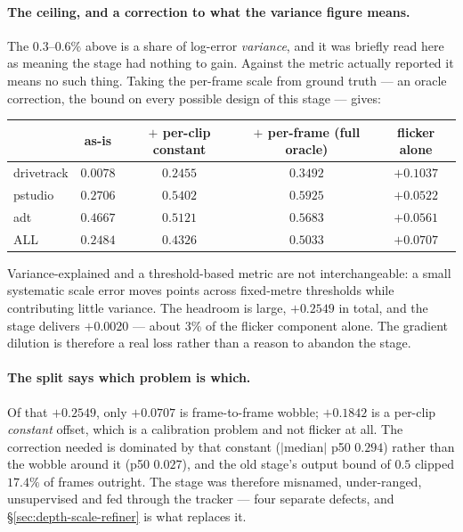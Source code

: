 \documentclass[11pt,a4paper]{article}
\begin{document}


\paragraph{The ceiling, and a correction to what the variance figure means.} The
$0.3$--$0.6\%$ above is a share of log-error \emph{variance}, and it was briefly read here as
meaning the stage had nothing to gain. Against the metric actually reported it means no such thing.
Taking the per-frame scale from ground truth --- an oracle correction, the bound on every possible
design of this stage --- gives:

\begin{center}\small
\begin{tabular}{lcccc}
\toprule
& as-is & $+$ per-clip constant & $+$ per-frame (full oracle) & flicker alone \\
\midrule
drivetrack & $0.0078$ & $0.2455$ & $0.3492$ & $+0.1037$ \\
pstudio    & $0.2706$ & $0.5402$ & $0.5925$ & $+0.0522$ \\
adt        & $0.4667$ & $0.5121$ & $0.5683$ & $+0.0561$ \\
\midrule
ALL        & $0.2484$ & $0.4326$ & $\mathbf{0.5033}$ & $\mathbf{+0.0707}$ \\
\bottomrule
\end{tabular}
\end{center}

Variance-explained and a threshold-based metric are not interchangeable: a small systematic scale
error moves points across fixed-metre thresholds while contributing little variance. The headroom is
large, $+0.2549$ in total, and the stage delivers $+0.0020$ --- about $3\%$ of the flicker component
alone. The gradient dilution is therefore a real loss rather than a reason to abandon the stage.

\paragraph{The split says which problem is which.} Of that $+0.2549$, only $+0.0707$ is
frame-to-frame wobble; $+0.1842$ is a per-clip \emph{constant} offset, which is a calibration
problem and not flicker at all. The correction needed is dominated by that constant ($|$median$|$
p50 $0.294$) rather than the wobble around it (p50 $0.027$), and the old stage's output bound of
$0.5$ clipped $17.4\%$ of frames outright. The stage was therefore misnamed, under-ranged,
unsupervised and fed through the tracker --- four separate defects, and \S\ref{sec:depth-scale-refiner} is what
replaces it.
\end{document}
